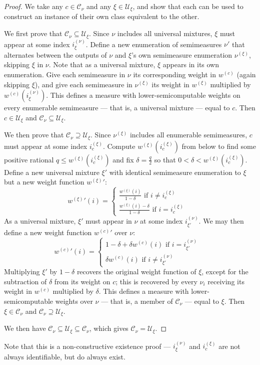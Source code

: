 \documentclass[11pt]{article}
\begin{document}
\begin{proof}
We take any $c\in\mathcal{C}_\nu$ and any $\xi\in\mathcal{U}_\xi$, and show that each can be used to construct an instance of their own class equivalent to the other.

We first prove that $\mathcal{C}_\nu\subseteq\mathcal{U}_\xi$.
Since $\nu$ includes all universal mixtures, $\xi$ must appear at some index $i_\xi^{(\nu)}$. Define a new enumeration of semimeasures $\nu'$ that alternates between the outputs of $\nu$ and $\xi$'s own semimeasure enumeration $\nu^{(\xi)}$, skipping $\xi$ in $\nu$. Note that as a universal mixture, $\xi$ appears in its own enumeration.
Give each semimeasure in $\nu$ its corresponding weight in $w^{(c)}$ (again skipping $\xi$), and give each semimeasure in $\nu^{(\xi)}$ its weight in $w^{(\xi)}$ multiplied by $w^{(c)}(i_\xi^{(\nu)})$.
This defines a measure with lower-semicomputable weights on every enumerable semimeasure --- that is, a universal mixture --- equal to $c$. Then $c\in\mathcal{U}_\xi$ and $\mathcal{C}_\nu\subseteq\mathcal{U}_\xi$.

We then prove that $\mathcal{C}_\nu\supseteq\mathcal{U}_\xi$.
Since $\nu^{(\xi)}$ includes all enumerable semimeasures, $c$ must appear at some index $i_c^{(\xi)}$.
Compute $w^{(\xi)}(i_c^{(\xi)})$ from below to find some positive rational $q\leq w^{(\xi)}(i_c^{(\xi)})$ and fix $\delta = \frac{q}{2}$ so that $0<\delta<w^{(\xi)}(i_c^{(\xi)})$.
Define a new universal mixture $\xi'$ with identical semimeasure enumeration to $\xi$ but a new weight function ${w^{(\xi)}}'$:
\[{w^{(\xi)}}'(i) = \begin{cases} \frac{w^{(\xi)}(i)}{1-\delta} \text{ if } i \neq i_c^{(\xi)} & \\ \frac{w^{(\xi)}(i)-\delta}{1-\delta} \text{ if } i = i_c^{(\xi)} \end{cases}\]
As a universal mixture, $\xi'$ must appear in $\nu$ at some index $i_{\xi'}^{(\nu)}$.
We may then define a new weight function ${w^{(c)}}'$ over $\nu$:
\[{w^{(c)}}'(i) = \begin{cases} 1-\delta + \delta w^{(c)}(i) \text{ if } i = i_{\xi'}^{(\nu)} & \\ \delta w^{(c)}(i) \text{ if } i \neq i_{\xi'}^{(\nu)} \end{cases}\]
Multiplying $\xi'$ by $1-\delta$ recovers the original weight function of $\xi$, except for the subtraction of $\delta$ from its weight on $c$; this is recovered by every $\nu_i$ receiving its weight in $w^{(c)}$ multiplied by $\delta$.
This defines a measure with lower-semicomputable weights over $\nu$ --- that is, a member of $\mathcal{C}_\nu$ --- equal to $\xi$. Then $\xi\in\mathcal{C}_\nu$ and $\mathcal{C}_\nu\supseteq\mathcal{U}_\xi$.

We then have $\mathcal{C}_\nu\subseteq\mathcal{U}_\xi\subseteq\mathcal{C}_\nu$, which gives $\mathcal{C}_\nu=\mathcal{U}_\xi$.
\end{proof}
Note that this is a non-constructive existence proof --- $i_\xi^{(\nu)}$ and $i_c^{(\xi)}$ are not always identifiable, but do always exist.
\end{document}
